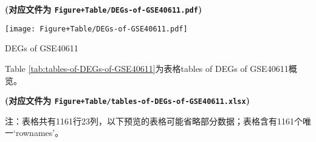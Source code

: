 \documentclass[
]{article}
\begin{document}
\textbf{(对应文件为 \texttt{Figure+Table/DEGs-of-GSE40611.pdf})}

\def\@captype{figure}
\begin{center}
\texttt{[image: Figure+Table/DEGs-of-GSE40611.pdf]}
\caption{DEGs of GSE40611}\label{fig:DEGs-of-GSE40611}
\end{center}

Table \ref{tab:tables-of-DEGs-of-GSE40611}为表格tables of DEGs of GSE40611概览。

\textbf{(对应文件为 \texttt{Figure+Table/tables-of-DEGs-of-GSE40611.xlsx})}

\begin{center}\begin{tcolorbox}[colback=gray!10, colframe=gray!50, width=0.9\linewidth, arc=1mm, boxrule=0.5pt]注：表格共有1161行23列，以下预览的表格可能省略部分数据；表格含有1161个唯一`rownames'。
\end{tcolorbox}
\end{center}
\end{document}
